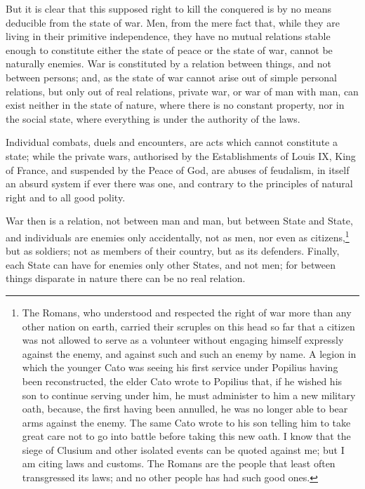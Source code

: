 \documentclass[12pt]{report}
\begin{document}
But it is clear that this supposed right to kill the conquered is by no means deducible from the state of war. Men, from the mere fact that, while they are living in their primitive independence, they have no mutual relations stable enough to constitute either the state of peace or the state of war, cannot be naturally enemies. War is constituted by a relation between things, and not between persons; and, as the state of war cannot arise out of simple personal relations, but only out of real relations, private war, or war of man with man, can exist neither in the state of nature, where there is no constant property, nor in the social state, where everything is under the authority of the laws.

Individual combats, duels and encounters, are acts which cannot constitute a state; while the private wars, authorised by the Establishments of Louis IX, King of France, and suspended by the Peace of God, are abuses of feudalism, in itself an absurd system if ever there was one, and contrary to the principles of natural right and to all good polity.

War then is a relation, not between man and man, but between State and State, and individuals are enemies only accidentally, not as men, nor even as citizens,\footnote{The Romans, who understood and respected the right of war more than any other nation on earth, carried their scruples on this head so far that a citizen was not allowed to serve as a volunteer without engaging himself expressly against the enemy, and against such and such an enemy by name. A legion in which the younger Cato was seeing his first service under Popilius having been reconstructed, the elder Cato wrote to Popilius that, if he wished his son to continue serving under him, he must administer to him a new military oath, because, the first having been annulled, he was no longer able to bear arms against the enemy. The same Cato wrote to his son telling him to take great care not to go into battle before taking this new oath. I know that the siege of Clusium and other isolated events can be quoted against me; but I am citing laws and customs. The Romans are the people that least often transgressed its laws; and no other people has had such good ones.} but as soldiers; not as members of their country, but as its defenders. Finally, each State can have for enemies only other States, and not men; for between things disparate in nature there can be no real relation.
\end{document}
